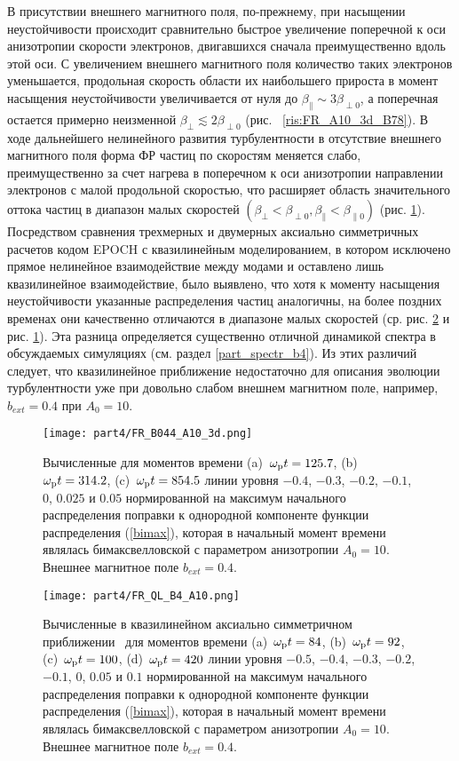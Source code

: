В присутствии внешнего магнитного поля, по-прежнему, при насыщении неустойчивости происходит сравнительно быстрое увеличение поперечной к оси анизотропии скорости электронов, двигавшихся сначала преимущественно вдоль этой оси. С увеличением внешнего магнитного поля количество таких электронов уменьшается,  продольная скорость области их наибольшего прироста в момент насыщения неустойчивости увеличивается от нуля до $\beta_\|\sim3\beta_{\perp0}$, а поперечная остается примерно неизменной $\beta_\perp\lesssim2\beta_{\perp0}$ (рис. ~\ref{ris:FR_A10_3d_B78}). В ходе дальнейшего нелинейного развития турбулентности в отсутствие внешнего магнитного поля форма ФР частиц по скоростям меняется слабо, преимущественно за счет нагрева в поперечном к оси анизотропии направлении электронов с малой продольной скоростью, что расширяет область значительного оттока частиц в диапазон малых скоростей $\left(\beta_\perp<\beta_{\perp0},\beta_\|<\beta_{\|0}\right)$ (рис. \ref{ris:FR_A10_3d_B44}). Посредством сравнения трехмерных и двумерных аксиально симметричных расчетов кодом EPOCH с квазилинейным моделированием, в котором исключено прямое нелинейное взаимодействие между модами и оставлено лишь квазилинейное взаимодействие, было выявлено, что хотя к моменту насыщения неустойчивости указанные распределения частиц аналогичны, на более поздних временах они качественно отличаются в диапазоне малых скоростей  (ср. рис. \ref{ris:FR_A10_3d_B44_QL} и рис. \ref{ris:FR_A10_3d_B44}). Эта разница определяется существенно отличной динамикой спектра в обсуждаемых симуляциях (см. раздел \ref{part_spectr_b4}). Из этих различий следует, что квазилинейное приближение недостаточно для описания эволюции турбулентности  уже при довольно слабом внешнем магнитном поле, например, $b_{ext}=0.4$ при $A_0=10$. 

\begin{figure}[h!]
\texttt{[image: part4/FR\_B044\_A10\_3d.png]}
\caption{Вычисленные для моментов времени (a)~$\omega_\mathrm{p} t = 125.7$, (b)~$\omega_\mathrm{p} t = 314.2$, (c)~$\omega_\mathrm{p} t = 854.5$ линии уровня $-0.4$, $-0.3$, $-0.2$, $-0.1$, $0$, $0.025$ и $0.05$ нормированной на максимум начального распределения поправки к однородной компоненте функции распределения (\ref{bimax}), которая в начальный момент времени являлась бимаксвелловской с параметром анизотропии $A_0=10$. Внешнее магнитное поле $b_{ext}=0.4$.}
\label{ris:FR_A10_3d_B44}
\end{figure}

\begin{figure}[h!]

\texttt{[image: part4/FR\_QL\_B4\_A10.png]}
\caption{Вычисленные в квазилинейном аксиально симметричном приближении~\cite{Kuznetsov2023} для моментов времени (a)~$\omega_\mathrm{p} t = 84$, (b)~$\omega_\mathrm{p} t = 92$, (c)~$\omega_\mathrm{p} t = 100$, (d)~$\omega_\mathrm{p} t = 420$ линии уровня $-0.5$, $-0.4$, $-0.3$, $-0.2$, $-0.1$, $0$, $0.05$ и $0.1$ нормированной на максимум начального распределения поправки к однородной компоненте функции распределения (\ref{bimax}), которая в начальный момент времени являлась бимаксвелловской с параметром анизотропии $A_0=10$. Внешнее магнитное поле $b_{ext}=0.4$.}
\label{ris:FR_A10_3d_B44_QL}
\end{figure}

